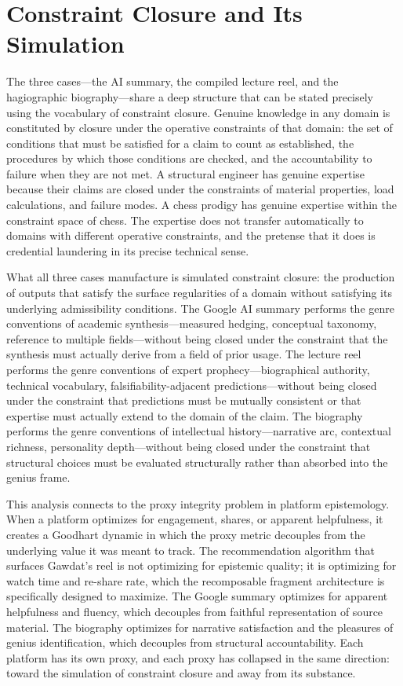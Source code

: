 \documentclass[12pt, a4paper]{article}
\begin{document}
\section{Constraint Closure and Its Simulation}

The three cases---the AI summary, the compiled lecture reel, and the hagiographic biography---share
a deep structure that can be stated precisely using the vocabulary of constraint closure. Genuine
knowledge in any domain is constituted by closure under the operative constraints of that domain:
the set of conditions that must be satisfied for a claim to count as established, the procedures by
which those conditions are checked, and the accountability to failure when they are not met. A
structural engineer has genuine expertise because their claims are closed under the constraints of
material properties, load calculations, and failure modes. A chess prodigy has genuine expertise
within the constraint space of chess. The expertise does not transfer automatically to domains with
different operative constraints, and the pretense that it does is credential laundering in its
precise technical sense.

What all three cases manufacture is simulated constraint closure: the production of outputs that
satisfy the surface regularities of a domain without satisfying its underlying admissibility
conditions. The Google AI summary performs the genre conventions of academic synthesis---measured
hedging, conceptual taxonomy, reference to multiple fields---without being closed under the
constraint that the synthesis must actually derive from a field of prior usage. The lecture reel
performs the genre conventions of expert prophecy---biographical authority, technical vocabulary,
falsifiability-adjacent predictions---without being closed under the constraint that predictions
must be mutually consistent or that expertise must actually extend to the domain of the claim. The
biography performs the genre conventions of intellectual history---narrative arc, contextual
richness, personality depth---without being closed under the constraint that structural choices must
be evaluated structurally rather than absorbed into the genius frame.

This analysis connects to the proxy integrity problem in platform epistemology. When a platform
optimizes for engagement, shares, or apparent helpfulness, it creates a Goodhart dynamic in which
the proxy metric decouples from the underlying value it was meant to track. The recommendation
algorithm that surfaces Gawdat's reel is not optimizing for epistemic quality; it is optimizing for
watch time and re-share rate, which the recomposable fragment architecture is specifically designed
to maximize. The Google summary optimizes for apparent helpfulness and fluency, which decouples
from faithful representation of source material. The biography optimizes for narrative satisfaction
and the pleasures of genius identification, which decouples from structural accountability. Each
platform has its own proxy, and each proxy has collapsed in the same direction: toward the
simulation of constraint closure and away from its substance.
\end{document}
